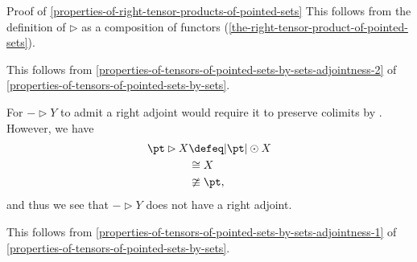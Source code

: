 \begin{Proof}{Proof of \cref{properties-of-right-tensor-products-of-pointed-sets}}%
    This follows from the definition of $\rhd$ as a composition of functors (\cref{the-right-tensor-product-of-pointed-sets}).

    This follows from \cref{properties-of-tensors-of-pointed-sets-by-sets-adjointness-2} of \cref{properties-of-tensors-of-pointed-sets-by-sets}.

    For $-\rhd Y$ to admit a right adjoint would require it to preserve colimits by . However, we have
    \begin{align*}
        \pt\rhd X &\defeq |\pt|\odot X\\
                  &\cong  X\\
                  &\ncong \pt,
    \end{align*}
    and thus we see that $-\rhd Y$ does not have a right adjoint.

    This follows from \cref{properties-of-tensors-of-pointed-sets-by-sets-adjointness-1} of \cref{properties-of-tensors-of-pointed-sets-by-sets}.
\end{Proof}
